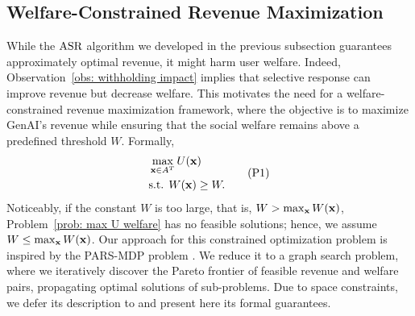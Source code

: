 \subsection{Welfare-Constrained Revenue Maximization} \label{sec: welfare constrained revenue maximization}
While the $\textnormal{ASR}$ algorithm we developed in the previous subsection guarantees approximately optimal revenue, it might harm user welfare. Indeed, Observation~\ref{obs: withholding impact} implies that selective response can improve revenue but decrease welfare. This motivates the need for a welfare-constrained revenue maximization framework, where the objective is to maximize GenAI's revenue while ensuring that the social welfare remains above a predefined threshold $W$. Formally, 
\begin{equation}\label{prob: max U welfare}
\begin{aligned}
& \max_{{\bf{x}} \in A^T} U({\bf{x}}) \\
& \textnormal{s.t. }  W({\bf{x}}) \geq W.
\end{aligned} \tag{P1}
\end{equation}
Noticeably, if the constant $W$ is too large, that is, $W > \max_{{\bf{x}}} W({\bf{x}})$, Problem~\eqref{prob: max U welfare} has no feasible solutions; hence, we assume $W \leq \max_{{\bf{x}}} W({\bf{x}})$.
Our approach for this constrained optimization problem is inspired by the PARS-MDP problem \cite{ben2024principal}. We reduce it to a graph search problem, where we iteratively discover the Pareto frontier of feasible revenue and welfare pairs, propagating optimal solutions of sub-problems. Due to space constraints, we defer its description to  and present here its formal guarantees.
